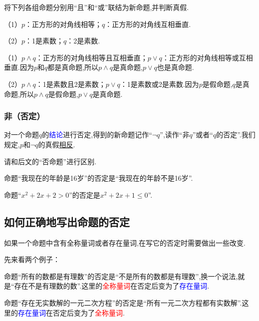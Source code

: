 \documentclass[lang=cn,math=cm,chinesefont=nofont,11pt,scheme=chinese,twocol]{elegantbook}
\begin{document}
\hspace*{\fill}

\begin{example}
  将下列各组命题分别用“且”和“或”联结为新命题,并判断真假.
\end{example}

（1）$p$：正方形的对角线相等；$q$：正方形的对角线互相垂直.

（2）$p$：1是素数；$q$：2是素数.

\begin{solution}
  （1）$p\land q$：正方形的对角线相等且互相垂直；$p\lor q$：正方形的对角线相等或互相垂直.因为$p$和$q$都是真命题,所以$p\land q$是真命题,$p\lor q$也是真命题.

  （2）$p\land q$：1是素数且2是素数；$p\lor q$：1是素数或2是素数.因为$p$是假命题,$q$是真命题,所以$p\land q$是假命题,$p\lor q$是真命题.
\end{solution}

\subsubsection{非（否定）}

对一个命题$q$的\textcolor{blue}{结论}进行否定,得到的新命题记作“$\neg q$”,读作“非$q$”或者“$q$的否定”.我们规定,$p$和$\neg q$的真假\underline{相反}.

\begin{remark}
  请和后文的“否命题”进行区别.
\end{remark}

\begin{example}
  命题“我现在的年龄是16岁”的否定是“我现在的年龄不是16岁”.
\end{example}

\begin{example}
  命题“$x^2+2x+2>0$”的否定是$x^2+2x+1\leq 0$”.
\end{example}

\subsection{如何正确地写出命题的否定}

如果一个命题中含有全称量词或者存在量词,在写它的否定时需要做出一些改变.

先来看两个例子：

命题“所有的数都是有理数”的否定是“不是所有的数都是有理数”,换一个说法,就是“存在不是有理数的数”.这里的\textcolor{red}{全称量词}在否定后变为了\textcolor{blue}{存在量词}.

命题“存在无实数解的一元二次方程”的否定是“所有一元二次方程都有实数解”.这里的\textcolor{blue}{存在量词}在否定后变为了\textcolor{red}{全称量词}.
\end{document}
